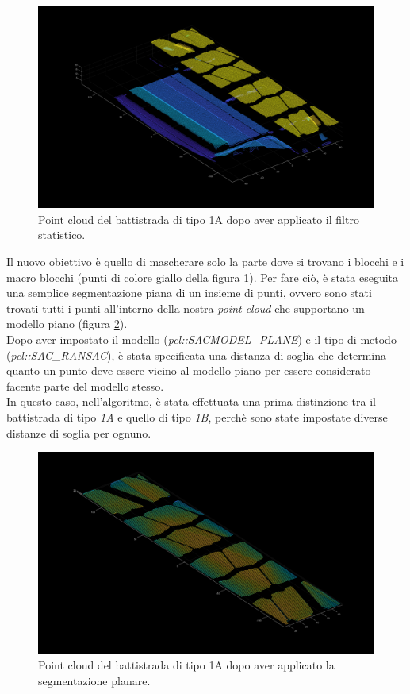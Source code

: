 \begin{figure}[H]
	\centering
	\includegraphics[width=0.8\columnwidth]{./pictures/batt_1a_analisi_2.png}
	\caption{Point cloud del battistrada di tipo 1A dopo aver applicato il filtro statistico.}\label{fig:batt_1a_analisi_2}
\end{figure}

\noindent Il nuovo obiettivo è quello di mascherare solo la parte dove si trovano i blocchi e i macro blocchi (punti di colore giallo della figura \ref{fig:batt_1a_analisi_2}). Per fare ciò, è stata eseguita una semplice segmentazione piana di un insieme di punti, ovvero sono stati trovati tutti i punti all'interno della nostra \textit{point cloud} che supportano un modello piano (figura \ref{fig:batt_1a_analisi_3}).\\
\newline
Dopo aver impostato il modello (\textit{pcl::SACMODEL\_PLANE}) e il tipo di metodo (\textit{pcl::SAC\_RANSAC}), è stata specificata una distanza di soglia che determina quanto un punto deve essere vicino al modello piano per essere considerato facente parte del modello stesso.\\
\newline
In questo caso, nell'algoritmo, è stata effettuata una prima distinzione tra il battistrada di tipo \textit{1A} e quello di tipo \textit{1B}, perchè sono state impostate diverse distanze di soglia per ognuno.

\begin{figure}[H]
	\centering
	\includegraphics[width=0.8\columnwidth]{./pictures/batt_1a_analisi_3.png}
	\caption{Point cloud del battistrada di tipo 1A dopo aver applicato la segmentazione planare.}\label{fig:batt_1a_analisi_3}
\end{figure}

